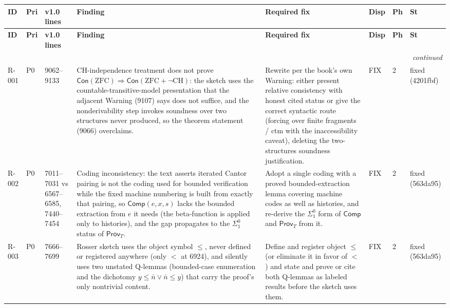 \begingroup\scriptsize\setlength{\tabcolsep}{3pt}
\begin{longtable}{@{}p{0.45in}p{0.25in}p{0.7in}p{2.2in}p{1.75in}p{0.45in}p{0.16in}p{0.34in}@{}}
\toprule
\textbf{ID} & \textbf{Pri} & \textbf{v1.0 lines} & \textbf{Finding} & \textbf{Required fix} & \textbf{Disp} & \textbf{Ph} & \textbf{St} \\
\midrule
\endfirsthead
\toprule
\textbf{ID} & \textbf{Pri} & \textbf{v1.0 lines} & \textbf{Finding} & \textbf{Required fix} & \textbf{Disp} & \textbf{Ph} & \textbf{St} \\
\midrule
\endhead
\midrule\multicolumn{8}{r}{\emph{continued}}\\\endfoot
\bottomrule\endlastfoot
R-001 & P0 & 9062--9133 & CH-independence treatment does not prove \(\mathsf{Con}(\mathrm{ZFC})\Rightarrow\mathsf{Con}(\mathrm{ZFC}+\neg\mathrm{CH})\): the sketch uses the countable-transitive-model presentation that the adjacent Warning (9107) says does not suffice, and the nonderivability step invokes soundness over two structures never produced, so the theorem statement (9066) overclaims. & Rewrite per the book's own Warning: either present relative consistency with honest cited status or give the correct syntactic route (forcing over finite fragments / ctm with the inaccessibility caveat), deleting the two-structures soundness justification. & FIX & 2 & fixed (4201fbf) \\
R-002 & P0 & 7011--7031 vs 6567--6585, 7440--7454 & Coding inconsistency: the text asserts iterated Cantor pairing is not the coding used for bounded verification while the fixed machine numbering is built from exactly that pairing, so \(\mathsf{Comp}(e,x,s)\) lacks the bounded extraction from \(e\) it needs (the beta-function is applied only to histories), and the gap propagates to the \(\Sigma^0_1\) status of \(\mathsf{Prov}_T\). & Adopt a single coding with a proved bounded-extraction lemma covering machine codes as well as histories, and re-derive the \(\Sigma^0_1\) form of \(\mathsf{Comp}\) and \(\mathsf{Prov}_T\) from it. & FIX & 2 & fixed (563da95) \\
R-003 & P0 & 7666--7699 & Rosser sketch uses the object symbol \(\leq\), never defined or registered anywhere (only \(<\) at 6924), and silently uses two unstated Q-lemmas (bounded-case enumeration and the dichotomy \(y\leq\bar n\lor\bar n\leq y\)) that carry the proof's only nontrivial content. & Define and register object \(\leq\) (or eliminate it in favor of \(<\)) and state and prove or cite both Q-lemmas as labeled results before the sketch uses them. & FIX & 2 & fixed (563da95) \\

\end{longtable}
